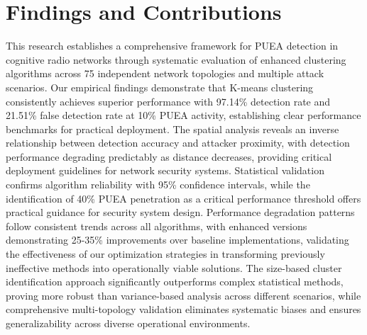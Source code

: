 \documentclass[pdflatex,sn-mathphys-num]{sn-jnl}%
\theoremstyle{thmstyleone}
\theoremstyle{thmstyletwo}
\theoremstyle{thmstylethree}
\begin{document}
\section{Findings and Contributions}\label{sec7}

This research establishes a comprehensive framework for PUEA detection in cognitive radio networks through systematic evaluation of enhanced clustering algorithms across 75 independent network topologies and multiple attack scenarios. Our empirical findings demonstrate that K-means clustering consistently achieves superior performance with 97.14\% detection rate and 21.51\% false detection rate at 10\% PUEA activity, establishing clear performance benchmarks for practical deployment. The spatial analysis reveals an inverse relationship between detection accuracy and attacker proximity, with detection performance degrading predictably as distance decreases, providing critical deployment guidelines for network security systems. Statistical validation confirms algorithm reliability with 95\% confidence intervals, while the identification of 40\% PUEA penetration as a critical performance threshold offers practical guidance for security system design. Performance degradation patterns follow consistent trends across all algorithms, with enhanced versions demonstrating 25-35\% improvements over baseline implementations, validating the effectiveness of our optimization strategies in transforming previously ineffective methods into operationally viable solutions. The size-based cluster identification approach significantly outperforms complex statistical methods, proving more robust than variance-based analysis across different scenarios, while comprehensive multi-topology validation eliminates systematic biases and ensures generalizability across diverse operational environments.
\end{document}
